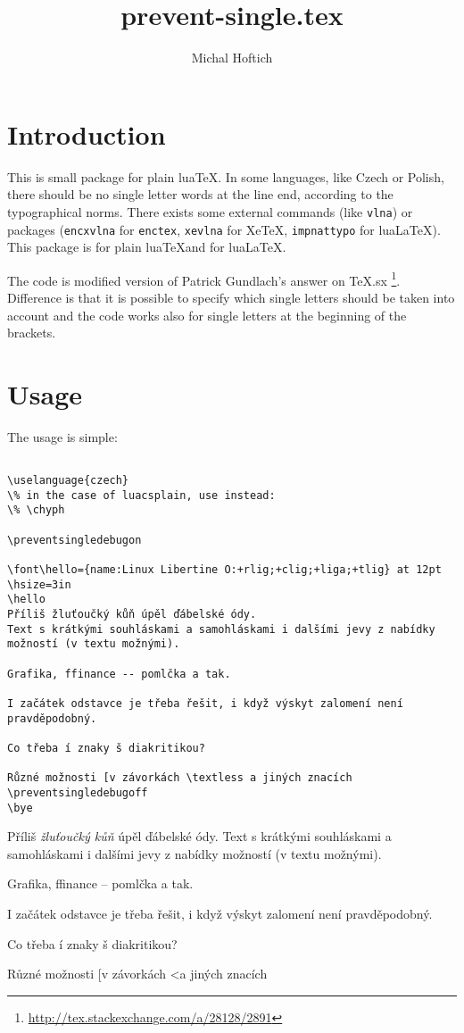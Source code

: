 \documentclass{ltxdoc}
\begin{document}
\title{prevent-single.tex}
\author{Michal Hoftich}
\maketitle
\section{Introduction}


This is small package for plain lua\TeX. In some languages, like
Czech or Polish, there should be no single letter words at the line
end, according to the typographical norms. There exists some
external commands (like \verb!vlna!) or packages (\verb!encxvlna!
for \verb!enctex!, \verb!xevlna! for Xe\TeX,
\verb!impnattypo! for lua\LaTeX). This package is for plain
lua\TeX and for lua\LaTeX.

The code is modified version of Patrick Gundlach's answer on
TeX.sx%
\footnote{\url{http://tex.stackexchange.com/a/28128/2891}}.
Difference is that it is possible to specify which single letters
should be taken into account and the code works also for single
letters at the beginning of the brackets.

\section{Usage}

The usage is simple:

\begin{verbatim}

\uselanguage{czech}
\% in the case of luacsplain, use instead:
\% \chyph

\preventsingledebugon

\font\hello={name:Linux Libertine O:+rlig;+clig;+liga;+tlig} at 12pt 
\hsize=3in
\hello
Příliš žluťoučký kůň úpěl ďábelské ódy. 
Text s krátkými souhláskami a samohláskami i dalšími jevy z nabídky možností (v textu možnými). 

Grafika, ffinance -- pomlčka a tak.

I začátek odstavce je třeba řešit, i když výskyt zalomení není pravděpodobný.

Co třeba í znaky š diakritikou?

Různé možnosti [v závorkách \textless a jiných znacích
\preventsingledebugoff
\bye
\end{verbatim}


\begin{minipage}{3in}
\preventsingledebugon
{}
Příliš \textit{žluťoučký kůň} úpěl ďábelské ódy. 
Text s krátkými souhláskami a samohláskami i dalšími jevy z nabídky možností (v textu možnými). 

Grafika, ffinance -- pomlčka a tak.

I začátek odstavce je třeba řešit, i když výskyt zalomení není pravděpodobný.

Co třeba í znaky š diakritikou?

Různé možnosti [v závorkách \textless a jiných znacích

\preventsingledebugoff
\preventsingledebugoff
\end{minipage}
\end{document}

